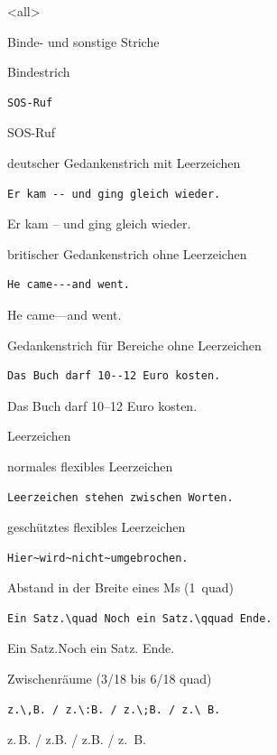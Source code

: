 \mode
<all>

\begin{Frame}[fragile]{Binde- und sonstige Striche}
  \begin{looseitemize}
    \item Bindestrich
      \begin{lstlisting}[gobble=8]
        SOS-Ruf
      \end{lstlisting}
      SOS-Ruf
    \item deutscher Gedankenstrich mit Leerzeichen
      \begin{lstlisting}[gobble=8]
        Er kam -- und ging gleich wieder.
      \end{lstlisting}
      Er kam -- und ging gleich wieder.
    \item britischer Gedankenstrich ohne Leerzeichen
      \begin{lstlisting}[gobble=8]
        He came---and went.
      \end{lstlisting}
      He came---and went.
    \item Gedankenstrich für Bereiche ohne Leerzeichen
      \begin{lstlisting}[gobble=8]
        Das Buch darf 10--12 Euro kosten.
      \end{lstlisting}
      Das Buch darf 10--12 Euro kosten.
  \end{looseitemize}
\end{Frame}

\begin{Frame}[fragile]{Leerzeichen}
  \begin{looseitemize}
    \item normales flexibles Leerzeichen
      \begin{lstlisting}[gobble=8]
        Leerzeichen stehen zwischen Worten.
      \end{lstlisting}
    \item geschütztes flexibles Leerzeichen
      \begin{lstlisting}[gobble=8]
        Hier~wird~nicht~umgebrochen.
      \end{lstlisting}
    \item Abstand in der Breite eines Ms (1~quad)
      \begin{lstlisting}[gobble=8]
        Ein Satz.\quad Noch ein Satz.\qquad Ende.
      \end{lstlisting}
      Ein Satz.\quad Noch ein Satz. \qquad Ende.
    \item Zwischenräume (3/18 bis 6/18 quad)
      \begin{lstlisting}[gobble=8]
        z.\,B. / z.\:B. / z.\;B. / z.\ B.
      \end{lstlisting}
      z.\,B. / z.\:B. / z.\;B. / z.\ B.
  \end{looseitemize}
\end{Frame}

